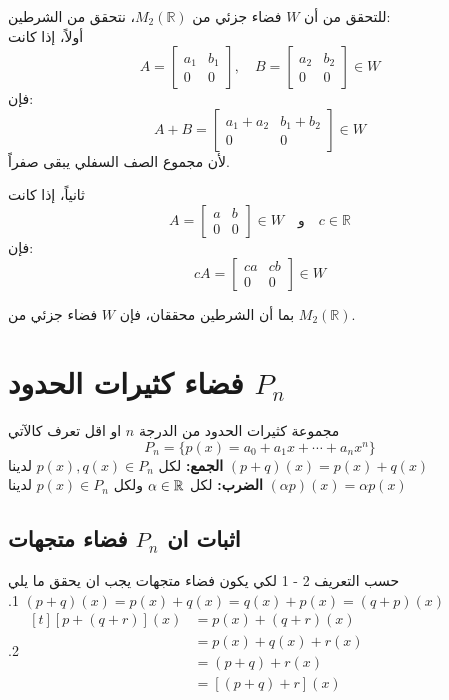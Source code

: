 \begin{solution}
	للتحقق من أن $W$ فضاء جزئي من $M_2(\mathbb{R})$، نتحقق من الشرطين:\\
	\noindent
	أولاً، إذا كانت 
	\[
	A = \begin{bmatrix} a_1 & b_1 \\ 0 & 0 \end{bmatrix}, \quad B = \begin{bmatrix} a_2 & b_2 \\ 0 & 0 \end{bmatrix} \in W
	\]
	فإن:
	\[
	A + B = \begin{bmatrix} a_1 + a_2 & b_1 + b_2 \\ 0 & 0 \end{bmatrix} \in W
	\]
	لأن مجموع الصف السفلي يبقى صفراً.
	
	\noindent
	ثانياً، إذا كانت 
	\[
	A = \begin{bmatrix} a & b \\ 0 & 0 \end{bmatrix} \in W \quad \text{و} \quad c \in \mathbb{R}
	\]
	فإن:
	\[
	cA = \begin{bmatrix} ca & cb \\ 0 & 0 \end{bmatrix} \in W
	\]
	
	بما أن الشرطين محققان، فإن $W$ فضاء جزئي من $M_2(\mathbb{R})$.
\end{solution}

\section[فضاء كثيرات الحدود $P_n$]{فضاء كثيرات الحدود $P_n$ \cite{key4}}
مجموعة كثيرات الحدود من الدرجة $n$ او اقل تعرف كالآتي
\[
P_n = \{p(x) = a_0 + a_1 x + \cdots + a_n x^n\}
\]
\textbf{الجمع:} لكل $p(x), q(x) \in P_n$ لدينا 
$
(p+q)(x) = p(x) + q(x)
$\\
\textbf{الضرب:} لكل $\alpha \in \mathbb{R}$ ولكل $p(x)\in P_n$ لدينا
$
(\alpha p)(x) = \alpha p(x)
$

\subsection*{اثبات ان $P_n$ فضاء متجهات}
حسب التعريف 2 - 1 لكي يكون فضاء متجهات يجب ان يحقق ما يلي\\

\setLR
\noindent
.1 $(p+q)(x) = p(x) + q(x) = q(x) + p(x) = (q+p)(x)$\\
.2 $
\begin{aligned}[t]
	[p+(q+r)](x) &= p(x) + (q+r)(x)\\
	&= p(x) + q(x) + r(x) \\
	&= (p+q) + r(x)\\
	&= [(p+q)+r](x)
\end{aligned}
$\\


